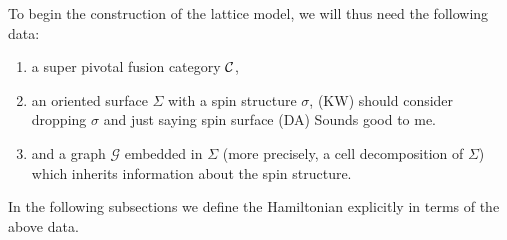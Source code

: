 \documentclass[12pt,a4paper]{article}
\newcommand{\mcg}{\mathcal{G}}
\newcommand{\mcc}{\mathcal{C}}
\newcommand{\kw}[1]{{\color{kwcolor}\footnotesize{(KW) #1}}}
\newcommand{\dave}[1]{{\color{ao(english)}\footnotesize{(DA) #1}}}
\newcommand{\ethan}[1]{{\color{amethyst}\footnotesize{(EL) #1}}}
\begin{document}
To begin the construction of the lattice model, we will thus need the following data:
\begin{enumerate}
\item a super pivotal fusion category ${\cal C}$,
\item an oriented surface $\Sigma$ with a spin structure $\sigma$,
\kw{should consider dropping $\sigma$ and just saying spin surface \dave{Sounds good to me.}}
\item and a graph $\mcg$ embedded in $\Sigma$ (more precisely, a cell decomposition of $\Sigma$) which inherits information about the spin structure.
\end{enumerate}
In the following subsections we define the Hamiltonian explicitly in terms of the above data.
\end{document}
